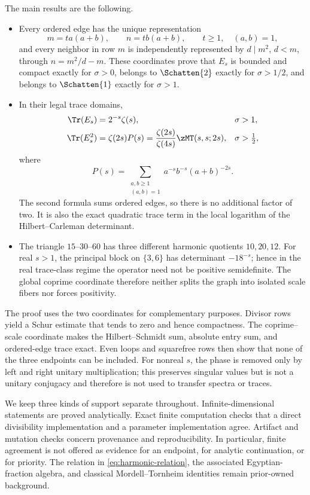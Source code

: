 The main results are the following.
\begin{itemize}
  \item Every ordered edge has the unique representation
  \[
    m=t a(a+b),\qquad n=t b(a+b),\qquad
    t\geq1,\quad (a,b)=1,
  \]
  and every neighbor in row $m$ is independently represented by
  $d\mid m^2$, $d<m$, through $n=m^2/d-m$.  These coordinates prove that
  $E_s$ is bounded and compact exactly for $\sigma>0$, belongs to
  $\Schatten{2}$ exactly for $\sigma>1/2$, and belongs to
  $\Schatten{1}$ exactly for $\sigma>1$.

  \item In their legal trace domains,
  \begin{align}
    \Tr(E_s)&=2^{-s}\zeta(s), && \sigma>1,
      \label{eq:intro-first-trace}\\
    \Tr(E_s^2)&=\zeta(2s)P(s)
      =\frac{\zeta(2s)}{\zeta(4s)}\zMT(s,s;2s),
      && \sigma>\tfrac12,
      \label{eq:intro-second-trace}
  \end{align}
  where
  \[
    P(s)=\sum_{\substack{a,b\geq1\\(a,b)=1}}
       a^{-s}b^{-s}(a+b)^{-2s}.
  \]
  The second formula sums ordered edges, so there is no additional factor
  of two.  It is also the exact quadratic trace term in the local
  logarithm of the Hilbert--Carleman determinant.

  \item The triangle $15$--$30$--$60$ has three different harmonic
  quotients $10,20,12$.  For real $s>1$, the principal block on
  $\{3,6\}$ has determinant $-18^{-s}$; hence in the real trace-class
  regime the operator need not be positive semidefinite.  The global
  coprime coordinate therefore neither splits the graph into isolated scale
  fibers nor forces positivity.
\end{itemize}

The proof uses the two coordinates for complementary purposes.  Divisor
rows yield a Schur estimate that tends to zero and hence compactness.  The
coprime--scale coordinate makes the Hilbert--Schmidt sum, absolute entry
sum, and ordered-edge trace exact.  Even loops and squarefree rows then
show that none of the three endpoints can be included.  For nonreal $s$,
the phase is removed only by left and right unitary multiplication; this
preserves singular values but is not a unitary conjugacy and therefore is
not used to transfer spectra or traces.

We keep three kinds of support separate throughout.  Infinite-dimensional
statements are proved analytically.  Exact finite computation checks that a
direct divisibility implementation and a parameter implementation agree.
Artifact and mutation checks concern provenance and reproducibility.  In
particular, finite agreement is not offered as evidence for an endpoint,
for analytic continuation, or for priority.  The relation in
\cref{eq:harmonic-relation}, the associated Egyptian-fraction algebra, and
classical Mordell--Tornheim identities remain prior-owned background.

